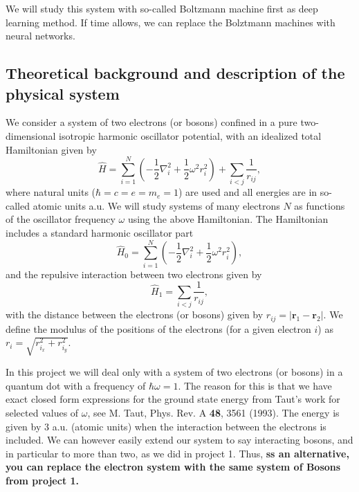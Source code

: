 \documentclass[%
oneside,                 %
final,                   %
10pt]{article}
\begin{document}
We will study this system with so-called Boltzmann machine first as deep learning method. If time allows, we can replace the Bolztmann machines with neural networks.

\subsection*{Theoretical background and description of the physical system}

We consider a system of two electrons (or bosons) confined in a pure two-dimensional 
isotropic harmonic oscillator potential, with an idealized  total Hamiltonian given by
\begin{equation}
\label{eq:finalH}
\hat{H}=\sum_{i=1}^{N} \left(  -\frac{1}{2} \nabla_i^2 + \frac{1}{2} \omega^2r_i^2  \right)+\sum_{i<j}\frac{1}{r_{ij}},
\end{equation}
where natural units ($\hbar=c=e=m_e=1$) are used and all energies are in so-called atomic units a.u. We will study systems of many electrons $N$ as functions of the oscillator frequency  $\omega$ using the above Hamiltonian.  The Hamiltonian includes a standard harmonic oscillator part
\begin{equation*}
\hat{H}_0=\sum_{i=1}^{N} \left(  -\frac{1}{2} \nabla_i^2 + \frac{1}{2} \omega^2r_i^2  \right),
\end{equation*}
and the repulsive interaction between two electrons given by
\begin{equation*}
\hat{H}_1=\sum_{i<j}\frac{1}{r_{ij}},
\end{equation*}
with the distance between the electrons (or bosons)  given by $r_{ij}=\vert \bm{r}_1-\bm{r}_2\vert$. We define the 
modulus of the positions of the electrons (for a given electron $i$) as $r_i = \sqrt{r_{i_x}^2+r_{i_y}^2}$.

In this project  we will deal only with a system of
two electrons (or bosons) in a quantum dot with a frequency of $\hbar\omega = 1$. 
The reason for this is that we have exact closed form expressions 
for the ground state energy from Taut's work for selected values of $\omega$, 
see M. Taut, Phys. Rev. A \textbf{48}, 3561 (1993).
The energy is given by $3$ a.u.  (atomic units) when the interaction between the electrons is included. We can however easily extend our system to say interacting bosons, and in particular to more than two,  as we did in project 1.
Thus, \textbf{ss an alternative, you can replace the electron system with the same system of Bosons from project 1.}
\end{document}
